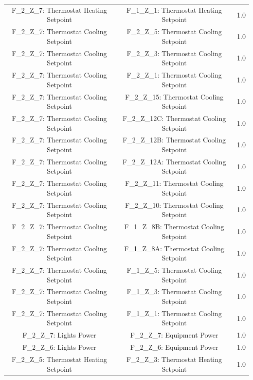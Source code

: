 \documentclass[aps, 10pt, a4paper]{article}
\begin{document}
\begin{longtable}{c|c||c}
                    F\_2\_Z\_7: Thermostat Heating Setpoint & F\_1\_Z\_1: Thermostat Heating Setpoint & 1.0 \\
                    F\_2\_Z\_7: Thermostat Cooling Setpoint & F\_2\_Z\_5: Thermostat Cooling Setpoint & 1.0 \\
                    F\_2\_Z\_7: Thermostat Cooling Setpoint & F\_2\_Z\_3: Thermostat Cooling Setpoint & 1.0 \\
                    F\_2\_Z\_7: Thermostat Cooling Setpoint & F\_2\_Z\_1: Thermostat Cooling Setpoint & 1.0 \\
                    F\_2\_Z\_7: Thermostat Cooling Setpoint & F\_2\_Z\_15: Thermostat Cooling Setpoint & 1.0 \\
                    F\_2\_Z\_7: Thermostat Cooling Setpoint & F\_2\_Z\_12C: Thermostat Cooling Setpoint & 1.0 \\
                    F\_2\_Z\_7: Thermostat Cooling Setpoint & F\_2\_Z\_12B: Thermostat Cooling Setpoint & 1.0 \\
                    F\_2\_Z\_7: Thermostat Cooling Setpoint & F\_2\_Z\_12A: Thermostat Cooling Setpoint & 1.0 \\
                    F\_2\_Z\_7: Thermostat Cooling Setpoint & F\_2\_Z\_11: Thermostat Cooling Setpoint & 1.0 \\
                    F\_2\_Z\_7: Thermostat Cooling Setpoint & F\_2\_Z\_10: Thermostat Cooling Setpoint & 1.0 \\
                    F\_2\_Z\_7: Thermostat Cooling Setpoint & F\_1\_Z\_8B: Thermostat Cooling Setpoint & 1.0 \\
                    F\_2\_Z\_7: Thermostat Cooling Setpoint & F\_1\_Z\_8A: Thermostat Cooling Setpoint & 1.0 \\
                    F\_2\_Z\_7: Thermostat Cooling Setpoint & F\_1\_Z\_5: Thermostat Cooling Setpoint & 1.0 \\
                    F\_2\_Z\_7: Thermostat Cooling Setpoint & F\_1\_Z\_3: Thermostat Cooling Setpoint & 1.0 \\
                    F\_2\_Z\_7: Thermostat Cooling Setpoint & F\_1\_Z\_1: Thermostat Cooling Setpoint & 1.0 \\
                    F\_2\_Z\_7: Lights Power & F\_2\_Z\_7: Equipment Power & 1.0 \\
                    F\_2\_Z\_6: Lights Power & F\_2\_Z\_6: Equipment Power & 1.0 \\
                    F\_2\_Z\_5: Thermostat Heating Setpoint & F\_2\_Z\_3: Thermostat Heating Setpoint & 1.0 \\

\end{longtable}
\end{document}
